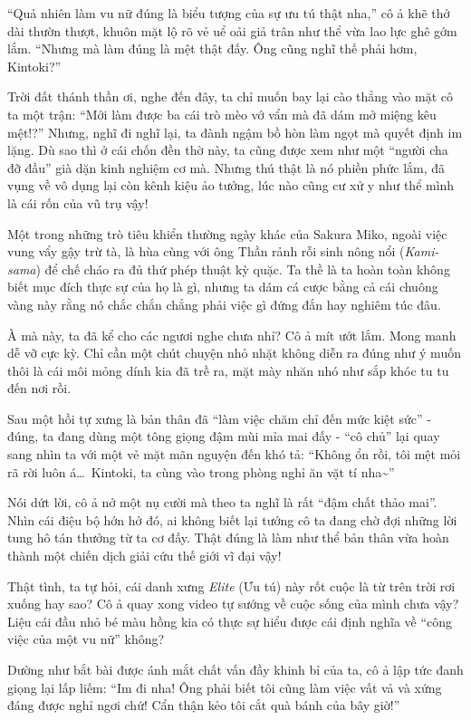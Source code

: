 \documentclass[../main.tex]{subfiles}
\begin{document}
``Quả nhiên làm vu nữ đúng là biểu tượng của sự ưu tú thật nha,'' cô ả khẽ thở dài thườn thượt, khuôn mặt lộ rõ vẻ uể oải giả trân như thể vừa lao lực ghê gớm lắm. ``Nhưng mà làm đúng là mệt thật đấy. Ông cũng nghĩ thế phải hơm, Kintoki?''

Trời đất thánh thần ơi, nghe đến đây, ta chỉ muốn bay lại cào thẳng vào mặt cô ta một trận: ``Mới làm được ba cái trò mèo vớ vẩn mà đã dám mở miệng kêu mệt!?'' Nhưng, nghĩ đi nghĩ lại, ta đành ngậm bồ hòn làm ngọt mà quyết định im lặng. Dù sao thì ở cái chốn đền thờ này, ta cũng được xem như một ``người cha đỡ đầu'' già dặn kinh nghiệm cơ mà. Nhưng thú thật là nó phiền phức lắm, đã vụng về vô dụng lại còn kênh kiệu ảo tưởng, lúc nào cũng cư xử y như thể mình là cái rốn của vũ trụ vậy!

\ct

Một trong những trò tiêu khiển thường ngày khác của Sakura Miko, ngoài việc vung vẩy gậy trừ tà, là hùa cùng với ông Thần rảnh rỗi sinh nông nổi (\textit{Kami-sama}) để chế cháo ra đủ thứ phép thuật kỳ quặc. Ta thề là ta hoàn toàn không biết mục đích thực sự của họ là gì, nhưng ta dám cá cược bằng cả cái chuông vàng này rằng nó chắc chắn chẳng phải việc gì đứng đắn hay nghiêm túc đâu.

À mà này, ta đã kể cho các ngươi nghe chưa nhỉ? Cô ả mít ướt lắm. Mong manh dễ vỡ cực kỳ. Chỉ cần một chút chuyện nhỏ nhặt không diễn ra đúng như ý muốn thôi là cái môi mỏng dính kia đã trề ra, mặt mày nhăn nhó như sắp khóc tu tu đến nơi rồi.

Sau một hồi tự xưng là bản thân đã ``làm việc chăm chỉ đến mức kiệt sức'' - đúng, ta đang dùng một tông giọng đậm mùi mỉa mai đấy - ``cô chủ'' lại quay sang nhìn ta với một vẻ mặt mãn nguyện đến khó tả: ``Không ổn rồi, tôi mệt mỏi rã rời luôn á\dots\ Kintoki, ta cùng vào trong phòng nghỉ ăn vặt tí nha\~{}''

Nói dứt lời, cô ả nở một nụ cười mà theo ta nghĩ là rất ``đậm chất thảo mai''. Nhìn cái điệu bộ hớn hở đó, ai không biết lại tưởng cô ta đang chờ đợi những lời tung hô tán thưởng từ ta cơ đấy. Thật đúng là làm như thể bản thân vừa hoàn thành một chiến dịch giải cứu thế giới vĩ đại vậy!

Thật tình, ta tự hỏi, cái danh xưng \textit{Elite} (Ưu tú) này rốt cuộc là từ trên trời rơi xuống hay sao? Cô ả quay xong video tự sướng về cuộc sống của mình chưa vậy? Liệu cái đầu nhỏ bé màu hồng kia có thực sự hiểu được cái định nghĩa về ``công việc của một vu nữ'' không?

Dường như bắt bài được ánh mắt chất vấn đầy khinh bỉ của ta, cô ả lập tức đanh giọng lại lấp liếm: ``Im đi nha! Ông phải biết tôi cũng làm việc vất vả và xứng đáng được nghỉ ngơi chứ! Cẩn thận kẻo tôi cắt quà bánh của bây giờ!''
\end{document}
